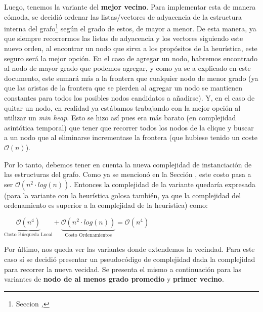 \par Luego, tenemos la variante del \textbf{mejor vecino}. Para implementar
    esta de manera c\'omoda, se decidi\'o ordenar las listas/vectores
    de adyacencia de la estructura interna del grafo\footnote{Seccion
    \emph{, }}
    seg\'un el grado de estos, de mayor a menor. De esta manera, ya que
    siempre recorrermos las listas de adyacencia y los vectores siguiendo
    este nuevo orden, al encontrar un nodo que sirva a los prop\'ositos
    de la heur\'istica, este seguro ser\'a la mejor opci\'on. En el caso
    de agregar un nodo, habremos encontrado al nodo de mayor grado
    que podemos agregar, y como ya se a explicado en este documento,
    este sumar\'a m\'as a la frontera que cualquier nodo de menor grado
    (ya que las aristas de la frontera que se pierden al agregar un nodo
    se mantienen constantes para todos los posibles nodos candidatos a
    a\~nadirse). Y, en el caso de quitar un nodo, en realidad ya est\'abamos
    trabajando con la mejor opci\'on al utilizar un \emph{min heap}. Esto
    se hizo as\'i pues era m\'as barato (en complejidad asint\'otica temporal)
    que tener que recorrer todos los nodos de la clique y buscar a un
    nodo que al eliminarse incrementase la frontera (que hubiese tenido
    un coste $\mathcal O(n)$).

\par Por lo tanto, debemos tener en cuenta la nueva complejidad de instanciaci\'on
    de las estructuras del grafo. Como ya se mencion\'o en la Secci\'on
    \emph{},
    este costo pasa a ser $\mathcal O(n^2\cdot log(n))$. Entonces la complejidad
    de la variante quedar\'ia expresada (para la variante con la heur\'istica golosa
    tambi\'en, ya que la complejidad del ordenamiento es superior a la complejidad
    de la heur\'istica) como:

\bigskip
\par $\underbrace{\mathcal O(n^4)}_{\text{Costo B\'usqueda Local}} +
    \underbrace{\mathcal O(n^2\cdot log(n))}_{\text{Costo Ordenamientos}} =
    \mathcal O(n^4)$
\bigskip

\par Por \'ultimo, nos queda ver las variantes donde extendemos la vecindad. Para este
    caso s\'i se decidi\'o presentar un pseudoc\'odigo de complejidad dada la complejidad
    para recorrer la nueva vecidad. Se presenta el mismo a continuaci\'on para las variantes
    de \textbf{nodo de al menos grado promedio} y \textbf{primer vecino}.

